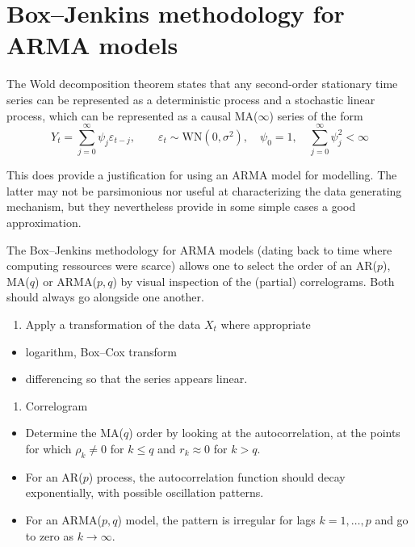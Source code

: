 \documentclass[]{book}
\providecommand{\tightlist}{%
  \setlength{\itemsep}{0pt}\setlength{\parskip}{0pt}}
\begin{document}
\hypertarget{boxjenkins-methodology-for-arma-models}{%
\section{Box--Jenkins methodology for ARMA models}\label{boxjenkins-methodology-for-arma-models}}

The Wold decomposition theorem states that any second-order stationary time series can be represented as a deterministic process and a stochastic linear process, which can be represented as a causal MA(\(\infty\)) series of the form
\[Y_t = \sum_{j = 0}^\infty \psi_j\varepsilon_{t-j}, \qquad \varepsilon_t \sim \mathrm{WN}(0, \sigma^2),\quad \psi_0 = 1, \quad\sum_{j = 0}^\infty \psi_j^2 < \infty\]

This does provide a justification for using an ARMA model for modelling. The latter may not be parsimonious nor useful at characterizing the data generating mechanism, but they nevertheless provide in some simple cases a good approximation.

The Box--Jenkins methodology for ARMA models (dating back to time where computing ressources were scarce) allows one to select the order of an AR(\(p\)), MA(\(q\)) or ARMA(\(p, q\)) by visual inspection of the (partial) correlograms. Both should always go alongside one another.

\begin{enumerate}
\def\labelenumi{\arabic{enumi}.}
\tightlist
\item
  Apply a transformation of the data \(X_t\) where appropriate
\end{enumerate}

\begin{itemize}
\tightlist
\item
  logarithm, Box--Cox transform
\item
  differencing so that the series appears linear.
\end{itemize}

\begin{enumerate}
\def\labelenumi{\arabic{enumi}.}
\setcounter{enumi}{1}
\tightlist
\item
  Correlogram
\end{enumerate}

\begin{itemize}
\tightlist
\item
  Determine the MA(\(q\)) order by looking at the autocorrelation, at the points for which \(\rho_k \neq 0\) for \(k \leq q\) and \(r_k \approx 0\) for \(k>q\).
\item
  For an AR(\(p\)) process, the autocorrelation function should decay exponentially, with possible oscillation patterns.
\item
  For an ARMA(\(p, q\)) model, the pattern is irregular for lags \(k = 1, \ldots, p\) and go to zero as \(k \to \infty\).
\end{itemize}
\end{document}
